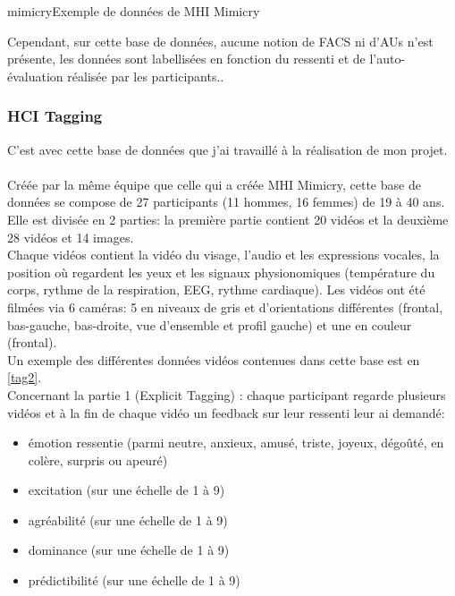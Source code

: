 \documentclass[poster]{polytech/polytech}
\begin{document}
\begin{Figure}{mimicry}{Exemple de données de MHI Mimicry}
\end{Figure}

Cependant, sur cette base de données, aucune notion de FACS ni d'AUs n'est présente, les données sont labellisées en fonction du ressenti et de l'auto-évaluation réalisée par les participants..

\subsubsection{HCI Tagging \cite{tagging1} \cite{tagging2}}
\label{hci-tagging}
C'est avec cette base de données que j'ai travaillé à la réalisation de mon projet.\\\\
Créée par la même équipe que celle qui a créée MHI Mimicry, cette base de données se compose de 27 participants (11 hommes, 16 femmes) de 19 à 40 ans.\\
Elle est divisée en 2 parties: la première partie contient 20 vidéos et la deuxième 28 vidéos et 14 images.\\
Chaque vidéos contient la vidéo du visage, l'audio et les expressions vocales, la position où regardent les yeux et les signaux physionomiques (température du corps, rythme de la respiration, EEG, rythme cardiaque). Les vidéos ont été filmées via 6 caméras: 5 en niveaux de gris et d'orientations différentes (frontal, bas-gauche, bas-droite, vue d'ensemble et profil gauche) et une en couleur (frontal).\\
Un exemple des différentes données vidéos contenues dans cette base est en \autoref{tag2}.\\
Concernant la partie 1 (Explicit Tagging) : chaque participant regarde plusieurs vidéos et à la fin de chaque vidéo un feedback sur leur ressenti leur ai demandé:
\begin{itemize}
\item émotion ressentie (parmi neutre, anxieux, amusé, triste, joyeux, dégoûté, en colère, surpris ou apeuré)
\item excitation (sur une échelle de 1 à 9)
\item agréabilité (sur une échelle de 1 à 9)
\item dominance (sur une échelle de 1 à 9)
\item prédictibilité (sur une échelle de 1 à 9)
\end{itemize}
\end{document}
